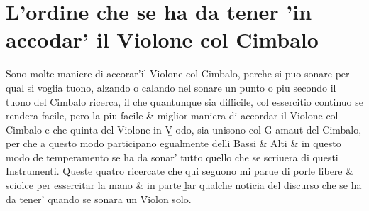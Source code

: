 \chapter{L'ordine che se ha da tener 'in accodar' il Violone col Cimbalo}
Sono molte maniere di accorar'il Violone col Cimbalo, perche si puo sonare per qual si voglia tuono, alzando o calando nel sonare un punto o piu secondo il tuono del Cimbalo ricerca, il che quantunque sia difficile, col essercitio continuo se rendera facile, pero la piu facile \& miglior maniera di accordar il Violone col Cimbalo e che quinta del Violone in \b{V odo}, sia unisono col G amaut del Cimbalo, per che a questo modo participano egualmente delli Bassi \& Alti \& in questo modo de temperamento se ha da sonar' tutto quello che se scriuera di questi Instrumenti.
Queste quatro ricercate che qui seguono mi parue di porle libere \& sciolce per essercitar la mano \& in parte \b{lar} qualche noticia del discurso che se ha da tener' quando se sonara un Violon solo.